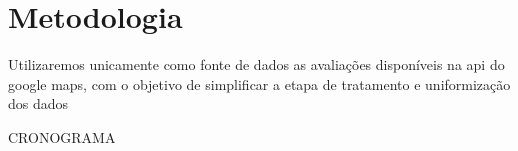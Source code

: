 \chapter{Metodologia}
\label{cap:metodologia}
Utilizaremos unicamente como fonte de dados as avaliações disponíveis na api do google maps, com o objetivo de simplificar a etapa de tratamento e uniformização dos dados

CRONOGRAMA















